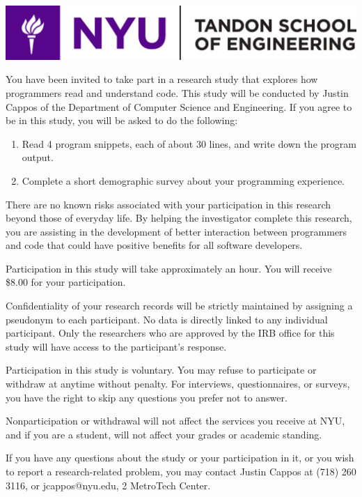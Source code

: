 \documentclass[12pt, a4paper, oneside]{article}
\date{}
\providecommand{\tightlist}{%
  \setlength{\itemsep}{0pt}\setlength{\parskip}{0pt}}
\begin{document}
\thispagestyle{empty}

\includegraphics[width=0.5\paperwidth]{images/tandon_long_color.png}

\vspace{20pt}

You have been invited to take part in a research study that explores
how programmers read and understand code. This study will be conducted
by Justin Cappos of the Department of Computer Science and Engineering.
If you agree to be in this study, you will be asked to do the
following:

\begin{enumerate}
\tightlist
\item
  {Read 4 program snippets, each of about 30 lines, and write down the
  program output.}
\item
  {Complete a short demographic survey about your programming
  experience.}
\end{enumerate}

There are no known risks associated with your participation in this
research beyond those of everyday life. By helping the investigator
complete this research, you are assisting in the development of better
interaction between programmers and code that could have positive
benefits for all software developers.

Participation in this study will take approximately an hour. You
will receive \$8.00 for your participation.

Confidentiality of your research records will be strictly maintained by
assigning a pseudonym to each participant. No data is directly linked to
any individual participant. Only the researchers who are approved by the
IRB office for this study will have access to the participant's
response.

Participation in this study is voluntary. You may refuse to participate
or withdraw at anytime without penalty. For interviews, questionnaires,
or surveys, you have the right to skip any questions you prefer not to
answer.

Nonparticipation or withdrawal will not affect the services you receive
at NYU, and if you are a student, will not affect your grades or
academic standing.

If you have any questions about the study or your participation in it,
or you wish to report a research-related problem, you may contact Justin
Cappos at (718) 260 3116, or jcappos@nyu.edu, 2 MetroTech Center.
\end{document}
